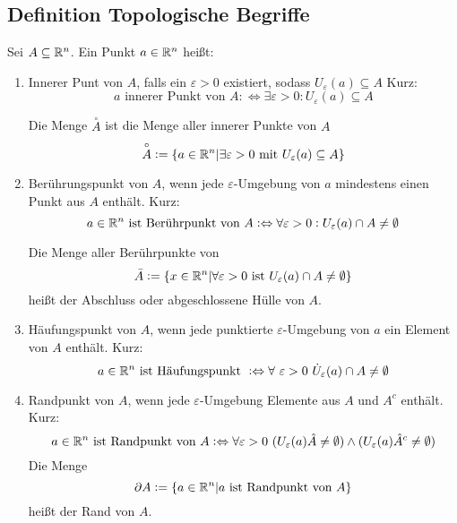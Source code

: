 \subsection{Definition Topologische Begriffe}
Sei $A \subseteq \mathbb{R}^n$. Ein Punkt $a \in \mathbb{R}^n$ heißt:
\begin{enumerate}[label= (\alph*)]
    \item Innerer Punt von $A$, falls ein $\varepsilon > 0$ existiert, sodass
        $U_\varepsilon(a) \subseteq A$
        Kurz:
        \begin{equation*}
            a \text{ innerer Punkt von }A :\Leftrightarrow \exists \varepsilon>0
            : U_\varepsilon(a) \subseteq A
        \end{equation*}

        Die Menge $\overset{\circ}{A}$ ist die Menge aller innerer Punkte von $A$
        \begin{equation*}
            \overset{\circ}{A} := \{ a \in \mathbb{R}^n | \exists \varepsilon > 0 \text{ mit }
            U_\varepsilon(a) \subseteq A \}
        \end{equation*}
    \item Berührungspunkt von $A$, wenn jede $\varepsilon$-Umgebung von $a$ mindestens
        einen Punkt aus $A$ enthält.
        Kurz:
        \begin{equation*}
            a \in \mathbb{R}^n \text{ ist Berührpunkt von } A :\Leftrightarrow
            \forall \varepsilon>0: U_\varepsilon(a) \cap A \neq \emptyset
        \end{equation*}

        Die Menge aller Berührpunkte von
        \begin{equation*}
            \bar{A} := \{ x \in \mathbb{R}^n | \forall \varepsilon > 0 \text{ ist }
            U_\varepsilon(a) \cap A \neq \emptyset \}
        \end{equation*}
        heißt der Abschluss oder abgeschlossene Hülle von $A$.
    \item Häufungspunkt von $A$, wenn jede punktierte $\varepsilon$-Umgebung von
        $a$ ein Element von $A$ enthält.
        Kurz:
        \begin{equation*}
            a \in \mathbb{R}^n \text{ ist Häufungspunkt } :\Leftrightarrow
            \forall\ \varepsilon > 0\ \dot{U}_\varepsilon(a) \cap A \neq \emptyset
        \end{equation*}
    \item Randpunkt von $A$, wenn jede $\varepsilon$-Umgebung Elemente aus $A$
        und $A^c$ enthält.
        Kurz:
        \begin{equation*}
            a \in \mathbb{R}^n \text{ ist Randpunkt von }A :\Leftrightarrow
            \forall \varepsilon > 0\
            (U_\varepsilon(a) \hat A \neq \emptyset) \land
            (U_\varepsilon(a) \hat A^c \neq \emptyset)
        \end{equation*}
        Die Menge
        \begin{equation*}
            \partial A := \{ a \in \mathbb{R}^n | a \text{ ist Randpunkt von }A \}
        \end{equation*}
        heißt der Rand von $A$.
\end{enumerate}

